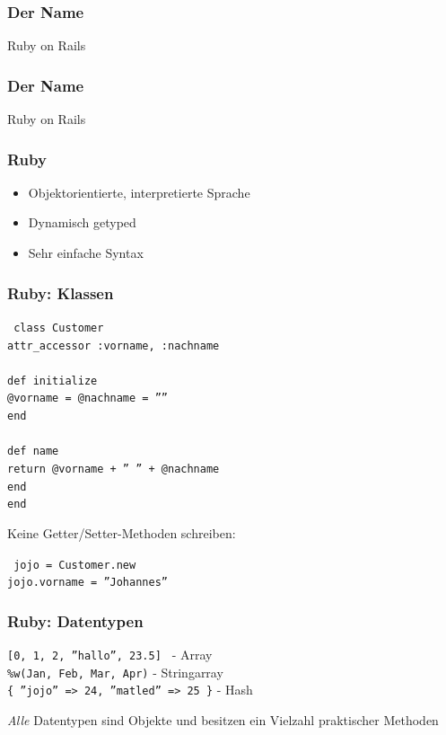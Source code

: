 \begin{frame}
  \frametitle{Der Name}
  \begin{center}
    \Huge Ruby \pause on Rails
  \end{center}
\end{frame}

\begin{frame}
  \frametitle{Der Name}
  \begin{center}
    \Huge {\color{red}Ruby} on Rails
  \end{center}
\end{frame}

\begin{frame}
  \frametitle{Ruby}
  \begin{itemize}
    \item Objektorientierte, interpretierte Sprache
    \item Dynamisch getyped
    \item Sehr einfache Syntax
  \end{itemize}
\end{frame}

\begin{frame}
  \frametitle{Ruby: Klassen}
  { \tt \small
  class Customer \\
  \enskip attr\_accessor :vorname, :nachname \\
  \enskip \\
  \enskip def initialize \\
  \enskip \enskip @vorname = @nachname = '''' \\
  \enskip end \\
  \enskip \\
  \enskip def name \\
  \enskip \enskip return @vorname + '' '' + @nachname \\
  \enskip end \\
  end \\
  }
  \begin{center}
    \small Keine Getter/Setter-Methoden schreiben:
  \end{center}
  { \tt \small
  jojo = Customer.new \\
  jojo.vorname = ''Johannes'' \\
  }
\end{frame}

\begin{frame}
  \frametitle{Ruby: Datentypen}
  { \tt \small [0, 1, 2, ''hallo'', 23.5] } - Array \\
  { \tt \small \%w(Jan, Feb, Mar, Apr)} - Stringarray \\
  { \tt \small \{ ''jojo'' => 24, ''matled'' => 25 \}} - Hash \\
  \vspace{0.3cm}
  \begin{center}
    \emph{Alle} Datentypen sind Objekte und besitzen ein Vielzahl praktischer Methoden
  \end{center}
\end{frame}

